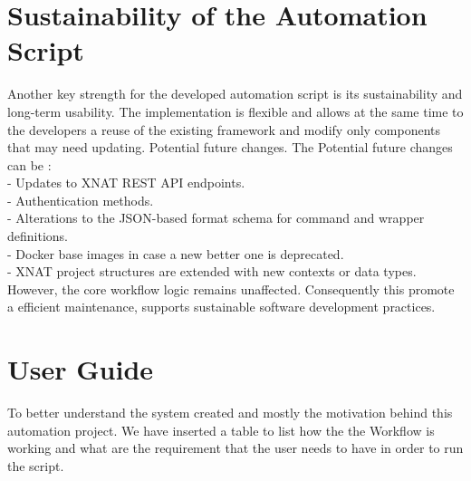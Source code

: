 \section{Sustainability of the Automation Script}

Another key strength for the developed automation script is its sustainability and long-term usability. The implementation is flexible and allows at the same time to the developers a reuse of the existing framework and modify only components that may need updating. Potential future changes. The Potential future changes can be :\\
- Updates to XNAT REST API endpoints.\\
- Authentication methods.\\
-  Alterations to the JSON-based format schema for command and wrapper definitions.\\
-  Docker base images in case a new better one is deprecated.\\
- XNAT project structures are extended with new contexts or data types.\\
However, the core workflow logic remains unaffected. Consequently this promote a efficient maintenance, supports sustainable software development practices.

\section{User Guide}
To better understand the system created and mostly the motivation behind this automation project. We have inserted a table to list how the the Workflow is working and what are the requirement that the user needs to have in order to run the script.

